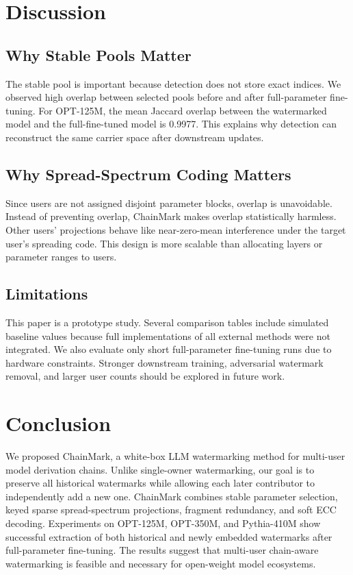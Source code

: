 \documentclass[sigconf]{acmart}
\newcommand{\method}{ChainMark}
\begin{document}
\section{Discussion}

\subsection{Why Stable Pools Matter}
The stable pool is important because detection does not store exact indices. We observed high overlap between selected pools before and after full-parameter fine-tuning. For OPT-125M, the mean Jaccard overlap between the watermarked model and the full-fine-tuned model is 0.9977. This explains why detection can reconstruct the same carrier space after downstream updates.

\subsection{Why Spread-Spectrum Coding Matters}
Since users are not assigned disjoint parameter blocks, overlap is unavoidable. Instead of preventing overlap, \method{} makes overlap statistically harmless. Other users' projections behave like near-zero-mean interference under the target user's spreading code. This design is more scalable than allocating layers or parameter ranges to users.

\subsection{Limitations}
This paper is a prototype study. Several comparison tables include simulated baseline values because full implementations of all external methods were not integrated. We also evaluate only short full-parameter fine-tuning runs due to hardware constraints. Stronger downstream training, adversarial watermark removal, and larger user counts should be explored in future work.

\section{Conclusion}
We proposed \method, a white-box LLM watermarking method for multi-user model derivation chains. Unlike single-owner watermarking, our goal is to preserve all historical watermarks while allowing each later contributor to independently add a new one. \method{} combines stable parameter selection, keyed sparse spread-spectrum projections, fragment redundancy, and soft ECC decoding. Experiments on OPT-125M, OPT-350M, and Pythia-410M show successful extraction of both historical and newly embedded watermarks after full-parameter fine-tuning. The results suggest that multi-user chain-aware watermarking is feasible and necessary for open-weight model ecosystems.
\end{document}
